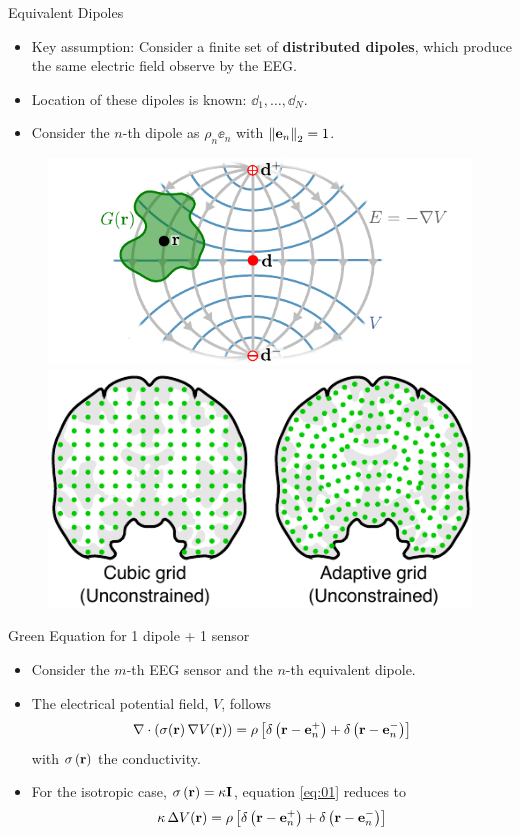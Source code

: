 \documentclass[progressbar=head]{beamer}
\begin{document}
\begin{frame}{Equivalent Dipoles}
\begin{itemize}
\item \alert{Key assumption:} Consider a finite set of \textbf{distributed dipoles}, which produce the same electric field observe by the EEG.
\item Location of these dipoles is known: $\dd_1, \dots, \dd_N$.
\item Consider the $n$-th dipole as $\rho_n \ee_n$ with $\left\lVert \mathbf{e}_n \right\rVert_2=1$.
\end{itemize}
\begin{figure}
\centering
\includegraphics[width=0.45\linewidth]{./img/CurrDensField}
\includegraphics[width=0.45\linewidth]{./img/Pregions_pic_radial_v2}
\end{figure}
\end{frame}

\begin{frame}{Green Equation for 1 dipole + 1 sensor}
\begin{itemize}
\item Consider the $m$-th EEG sensor and the $n$-th equivalent dipole.
\item The electrical potential field, $V$, follows
\begin{equation}
\nabla \cdot\left( \sigma(\mathbf{r})\, \nabla V(\mathbf{r})  \right) = 
\rho\left[  \delta\left( \mathbf{r}-\mathbf{e}_n^+ \right) + \delta\left( \mathbf{r}-\mathbf{e}_n^- \right)  \right]
\label{eq:01}
\end{equation}
with $\sigma\left( \mathbf{r} \right)$ the conductivity.
\item For the isotropic case, $\sigma\left( \mathbf{r} \right)= \kappa \mathbf{I}$, equation \ref{eq:01} reduces to 
\begin{equation}
\kappa\, \Delta { V(\mathbf{r}) } = 
\rho\left[  \delta\left( \mathbf{r}-\mathbf{e}_n^+ \right) + \delta\left( \mathbf{r}-\mathbf{e}_n^- \right)  \right]
\label{eq:02}
\end{equation}
\end{itemize}
\end{frame}
\end{document}
